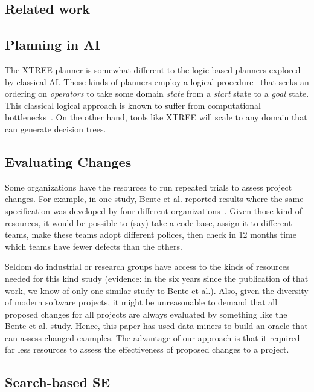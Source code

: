 \documentclass{sig-alternate}
\begin{document}
{\begin{itemize}[leftmargin=3mm]
 
\section{Related work}

\subsection{Planning in AI}

The XTREE planner is somewhat different to the logic-based planners explored by 
classical AI. 
Those kinds of planners employ a logical procedure~\cite{Fikes1971}
that seeks an ordering on {\em operators} to take some domain
{\em state} from a {\em start} state to a {\em  goal} state.
This classical logical approach is known to suffer from
computational bottlenecks~\cite{Bylander1994}. On the other hand, tools like XTREE will scale to any domain
that can generate decision trees.
  
\subsection{Evaluating Changes}

Some organizations have the resources to 
run repeated trials to assess  project changes.
For example, in one   study, Bente et al. reported results
where the same  specification was developed by four different organizations~\cite{Anda2009}. Given those kind of resources, it would be possible
to (say) take a code base, assign it to different teams, make these teams  adopt different polices,
then check in 12 months time
 which teams have fewer defects than the others.  
 

Seldom do industrial or research groups have access
to the kinds of resources needed for this kind study  (evidence: in the six years since the
publication of that work, we know of only one   similar study to Bente et al.). Also, given the
diversity of modern software projects, it might be unreasonable to demand that all
proposed changes for all projects are always evaluated by something like the Bente et al. study.
Hence, this paper has used data miners to build an oracle that can assess changed examples. The advantage
of our approach is that it required far less resources to assess the effectiveness of proposed
changes to a project.  

\subsection{Search-based SE}


\end{itemize}}
\end{document}
